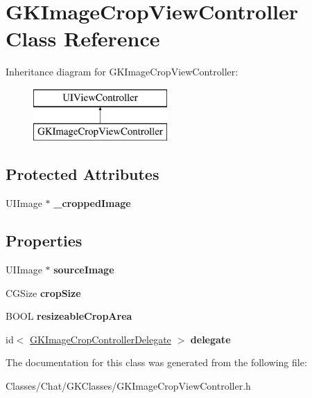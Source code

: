 \hypertarget{interface_g_k_image_crop_view_controller}{}\section{G\+K\+Image\+Crop\+View\+Controller Class Reference}
\label{interface_g_k_image_crop_view_controller}
Inheritance diagram for G\+K\+Image\+Crop\+View\+Controller\+:\begin{figure}[H]
\begin{center}
\leavevmode
\includegraphics[height=2.000000cm]{interface_g_k_image_crop_view_controller}
\end{center}
\end{figure}
\subsection*{Protected Attributes}
\begin{DoxyCompactItemize}
\item 
\hypertarget{interface_g_k_image_crop_view_controller_a020ed821e9a0c2901f6b64fa1c871799}{}U\+I\+Image $\ast$ {\bfseries \+\_\+cropped\+Image}\label{interface_g_k_image_crop_view_controller_a020ed821e9a0c2901f6b64fa1c871799}

\end{DoxyCompactItemize}
\subsection*{Properties}
\begin{DoxyCompactItemize}
\item 
\hypertarget{interface_g_k_image_crop_view_controller_ad577623a3ce36bdefa01dbcea1920bc1}{}U\+I\+Image $\ast$ {\bfseries source\+Image}\label{interface_g_k_image_crop_view_controller_ad577623a3ce36bdefa01dbcea1920bc1}

\item 
\hypertarget{interface_g_k_image_crop_view_controller_af45e7e7ecf6b7827c133c4b229311487}{}C\+G\+Size {\bfseries crop\+Size}\label{interface_g_k_image_crop_view_controller_af45e7e7ecf6b7827c133c4b229311487}

\item 
\hypertarget{interface_g_k_image_crop_view_controller_a8eee898d7fb4b3688dc99ae183dde58f}{}B\+O\+O\+L {\bfseries resizeable\+Crop\+Area}\label{interface_g_k_image_crop_view_controller_a8eee898d7fb4b3688dc99ae183dde58f}

\item 
\hypertarget{interface_g_k_image_crop_view_controller_aceef2730d9f5f7553358de4f7e4b0ac7}{}id$<$ \hyperlink{protocol_g_k_image_crop_controller_delegate-p}{G\+K\+Image\+Crop\+Controller\+Delegate} $>$ {\bfseries delegate}\label{interface_g_k_image_crop_view_controller_aceef2730d9f5f7553358de4f7e4b0ac7}

\end{DoxyCompactItemize}


The documentation for this class was generated from the following file\+:\begin{DoxyCompactItemize}
\item 
Classes/\+Chat/\+G\+K\+Classes/G\+K\+Image\+Crop\+View\+Controller.\+h\end{DoxyCompactItemize}
